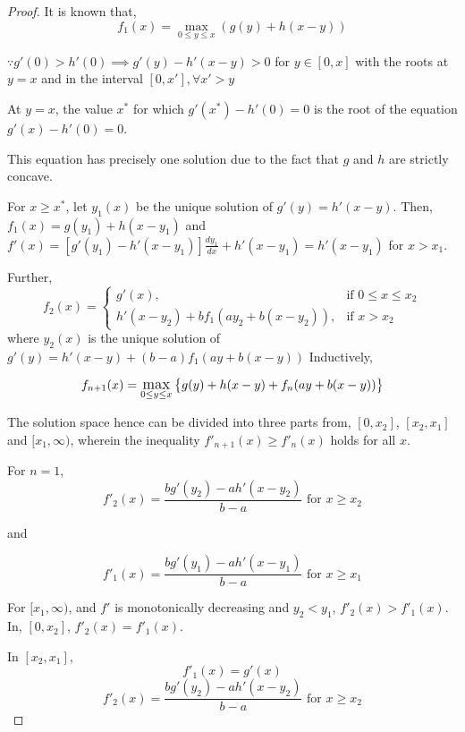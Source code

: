 \begin{proof}
    It is known that, 
    $$f_1(x) = \max_{0 \le y \le x}(g(y) + h(x-y))$$

    $\because g'(0) > h'(0) \implies g'(y)-h'(x-y)>0$ for $y \in [0, x]$ with the roots at $y=x$ and in the interval $[0, x'], \forall x' > y$

    At $y=x$, the value $x^*$ for which $g'(x^*)-h'(0) = 0$ is the root of the equation $g'(x)-h'(0) = 0$.

    This equation has precisely one solution due to the fact that $g$ and $h$ are strictly concave.

    For $x \ge x^*$, let $y_1 (x)$ be the unique solution of $g' (y) = h' (x - y)$. Then, $f_1(x) = g(y_1) + h(x-y_1)$ and $f'(x) = [g'(y_1) - h'(x-y_1)]\frac{dy_1}{dx} + h'(x-y_1) = h'(x-y_1)$ for $x > x_1$.

    Further, 
    \begin{equation*}
        f_2(x) = 
        \begin{cases}
            g'(x), & \text{if } 0 \le x \le x_2\\
            h'(x-y_2) + bf_1(ay_2+b(x-y_2)), & \text{if } x > x_2
        \end{cases}
    \end{equation*}
    where $y_2(x)$ is the unique solution of $g'(y) = h'(x-y) + (b-a)f_1(ay+b(x-y))$
    Inductively, 

    $$
    f_{n+1}(x) = \mathlarger{\max}_{0 \le y \le x} \left\{ g(y) + h(x-y) + f_n(ay+b(x-y)) \right\}
    $$

    The solution space hence can be divided into three parts from, $[0, x_2]$, $[x_2, x_1]$ and $[x_1, \infty)$, wherein the inequality $f'_{n+1}(x) \ge f'_{n}(x)$ holds for all $x$.
    
    For $n=1$, 
    $$
    f'_2(x) = \frac{bg'(y_2) - ah'(x-y_2)}{b-a} \text{ for } x \ge x_2
    $$
    
    and 
    
    $$
    f'_1(x) = \frac{bg'(y_1) - ah'(x-y_1)}{b-a} \text{ for } x \ge x_1
    $$
    
    For $[x_1, \infty)$, and $f'$ is monotonically decreasing and $y_2 < y_1$, $f'_2(x) > f'_1(x)$. In, $[0, x_2]$, $f'_2(x) = f'_1(x)$.
    
    \vspace{5mm}
    In $[x_2, x_1]$,
    $$
    f'_1(x) = g'(x)
    $$
    $$
    f'_2(x) = \frac{bg'(y_2) - ah'(x-y_2)}{b-a} \text{ for } x \ge x_2
    $$


\end{proof}
